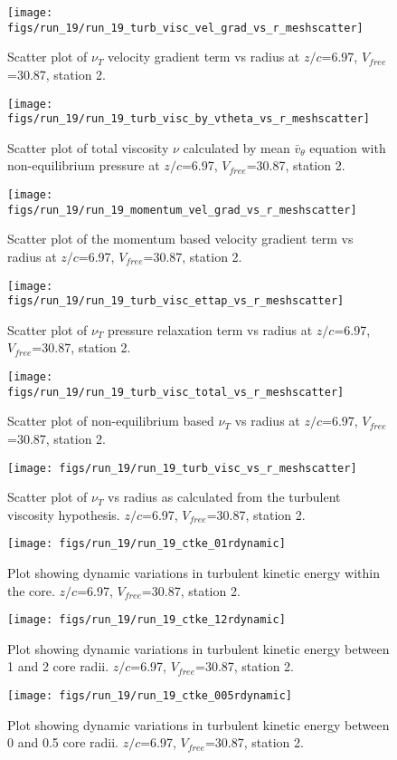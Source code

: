 \begin{figure}[H]
\centering
\texttt{[image: figs/run\_19/run\_19\_turb\_visc\_vel\_grad\_vs\_r\_meshscatter]}
\caption{Scatter plot of $\nu_T$ velocity gradient term vs radius at $z/c$=6.97, $V_{free}$=30.87, station 2.}
\end{figure}


\begin{figure}[H]
\centering
\texttt{[image: figs/run\_19/run\_19\_turb\_visc\_by\_vtheta\_vs\_r\_meshscatter]}
\caption{Scatter plot of total viscosity $\nu$ calculated by mean $\bar{v}_{\theta}$ equation with non-equilibrium pressure at $z/c$=6.97, $V_{free}$=30.87, station 2.}
\end{figure}


\begin{figure}[H]
\centering
\texttt{[image: figs/run\_19/run\_19\_momentum\_vel\_grad\_vs\_r\_meshscatter]}
\caption{Scatter plot of the momentum based velocity gradient term vs radius at $z/c$=6.97, $V_{free}$=30.87, station 2.}
\end{figure}


\begin{figure}[H]
\centering
\texttt{[image: figs/run\_19/run\_19\_turb\_visc\_ettap\_vs\_r\_meshscatter]}
\caption{Scatter plot of $\nu_T$ pressure relaxation term vs radius at $z/c$=6.97, $V_{free}$=30.87, station 2.}
\end{figure}


\begin{figure}[H]
\centering
\texttt{[image: figs/run\_19/run\_19\_turb\_visc\_total\_vs\_r\_meshscatter]}
\caption{Scatter plot of non-equilibrium based $\nu_T$ vs radius at $z/c$=6.97, $V_{free}$=30.87, station 2.}
\end{figure}


\begin{figure}[H]
\centering
\texttt{[image: figs/run\_19/run\_19\_turb\_visc\_vs\_r\_meshscatter]}
\caption{Scatter plot of $\nu_T$ vs radius as calculated from the turbulent viscosity hypothesis. $z/c$=6.97, $V_{free}$=30.87, station 2.}
\end{figure}


\begin{figure}[H]
\centering
\texttt{[image: figs/run\_19/run\_19\_ctke\_01rdynamic]}
\caption{Plot showing dynamic variations in turbulent kinetic energy within the core. $z/c$=6.97, $V_{free}$=30.87, station 2.}
\end{figure}


\begin{figure}[H]
\centering
\texttt{[image: figs/run\_19/run\_19\_ctke\_12rdynamic]}
\caption{Plot showing dynamic variations in turbulent kinetic energy between 1 and 2 core radii. $z/c$=6.97, $V_{free}$=30.87, station 2.}
\end{figure}


\begin{figure}[H]
\centering
\texttt{[image: figs/run\_19/run\_19\_ctke\_005rdynamic]}
\caption{Plot showing dynamic variations in turbulent kinetic energy between 0 and 0.5 core radii. $z/c$=6.97, $V_{free}$=30.87, station 2.}
\end{figure}


